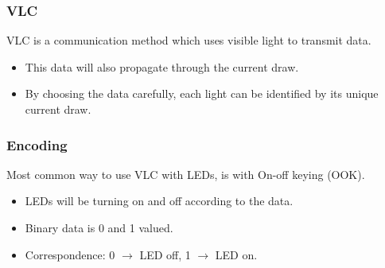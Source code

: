 \documentclass{beamer}
\begin{document}
	\begin{frame}\frametitle{VLC}

		VLC is a communication method which uses visible light to transmit data.

		\begin{itemize}

			\item This data will also propagate through the current draw.

			\item By choosing the data carefully, each light can be identified by its unique current draw.

		\end{itemize}

	\end{frame}






	\begin{frame}\frametitle{Encoding}

		Most common way to use VLC with LEDs, is with On-off keying (OOK).

		\begin{itemize}

			\item LEDs will be turning on and off according to the data.

			\item Binary data is 0 and 1 valued.

			\item Correspondence: 0 $\xrightarrow{}$ LED off, 1 $\xrightarrow{}$ LED on.

		\end{itemize}
	\end{frame}
\end{document}
